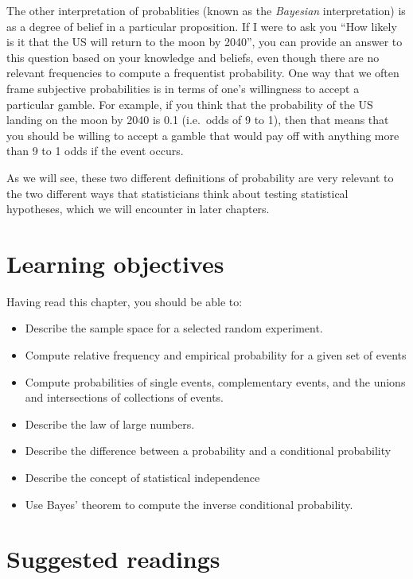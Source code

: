 \documentclass[
  12pt,
]{book}
\providecommand{\tightlist}{%
  \setlength{\itemsep}{0pt}\setlength{\parskip}{0pt}}
\begin{document}
The other interpretation of probablities (known as the \emph{Bayesian} interpretation) is as a degree of belief in a particular proposition. If I were to ask you ``How likely is it that the US will return to the moon by 2040'', you can provide an answer to this question based on your knowledge and beliefs, even though there are no relevant frequencies to compute a frequentist probability. One way that we often frame subjective probabilities is in terms of one's willingness to accept a particular gamble. For example, if you think that the probability of the US landing on the moon by 2040 is 0.1 (i.e.~odds of 9 to 1), then that means that you should be willing to accept a gamble that would pay off with anything more than 9 to 1 odds if the event occurs.

As we will see, these two different definitions of probability are very relevant to the two different ways that statisticians think about testing statistical hypotheses, which we will encounter in later chapters.

\hypertarget{learning-objectives-5}{%
\section{Learning objectives}\label{learning-objectives-5}}

Having read this chapter, you should be able to:

\begin{itemize}
\tightlist
\item
  Describe the sample space for a selected random experiment.
\item
  Compute relative frequency and empirical probability for a given set of events
\item
  Compute probabilities of single events, complementary events, and the unions and intersections of collections of events.
\item
  Describe the law of large numbers.
\item
  Describe the difference between a probability and a conditional probability
\item
  Describe the concept of statistical independence
\item
  Use Bayes' theorem to compute the inverse conditional probability.
\end{itemize}

\hypertarget{suggested-readings-3}{%
\section{Suggested readings}\label{suggested-readings-3}}
\end{document}
